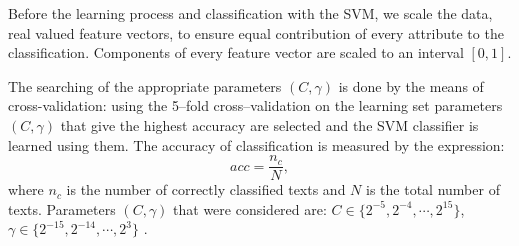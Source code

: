 \documentclass{llncs}
\begin{document}
Before the learning process and classification with the SVM, we scale the data,
real valued feature vectors, to ensure equal contribution of every attribute to
the classification. Components of every feature vector are scaled to an interval
$[0, 1]$.

The searching of the appropriate parameters $(C, \gamma)$ is done by the means
of cross-validation: using the 5--fold cross--validation on the
learning set parameters $(C, \gamma)$ that give the highest accuracy are
selected and the SVM classifier is learned using them. 
The accuracy of classification is measured by the expression:
\begin{equation}
acc = \frac{n_c}{N}, %
\end{equation}
where $n_c$ is the number of correctly classified texts and $N$ is the total number of
texts.
Parameters $(C, \gamma)$ that were considered are: $C \in \{2^{-5}, 2^{-4},
\cdots , 2^{15}\}$, $\gamma \in \{2^{-15}, 2^{-14}, \cdots, 2^3\}$ \cite{CC01a}.
\end{document}
